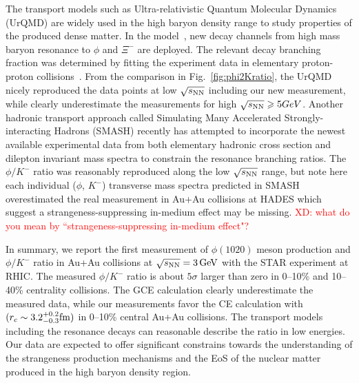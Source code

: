 \documentclass[%
 reprint,	
showpacs,
 amsmath,amssymb,
 aps,
 prc,
]{revtex4-1}
\begin{document}
The transport models such as Ultra-relativistic Quantum Molecular Dynamics (UrQMD) are widely used in the high baryon density range to study properties of the produced dense matter. In the model~\cite{Steinheimer_2015}, new decay channels from high mass baryon resonance to $\phi$ and $\Xi^-$ are deployed. The relevant decay branching fraction was determined by fitting the experiment data in elementary proton-proton collisions~\cite{PhysRevC.77.015204}. From the comparison in Fig.~\ref{fig:phi2Kratio}, the UrQMD nicely reproduced the data points at low ${\sqrt{s_{\rm NN}}}$ including our new measurement, while clearly underestimate the measurements for high $\sqrt{s_{\rm NN}}\geqslant 5 GeV$. Another hadronic transport approach called Simulating Many Accelerated Strongly-interacting Hadrons (SMASH) recently has attempted to incorporate the newest available experimental data from both elementary hadronic cross section and dilepton invariant mass spectra to constrain the resonance branching ratios. The $\phi/K^-$ ratio was reasonably reproduced along the low ${\sqrt{s_{\rm NN}}}$ range, but note here each individual ($\phi$, $K^-$) transverse mass spectra predicted in SMASH overestimated the real measurement in Au+Au collisions at HADES which suggest a strangeness-suppressing in-medium effect may be missing. \textcolor{red}{XD: what do you mean by ``strangeness-suppressing in-medium effect"?}

In summary, we report the first measurement of $\phi(1020)$ meson production and $\phi/K^-$ ratio in Au+Au collisions at ${\sqrt{s_{\rm NN}} = \rm{3\,GeV}}$ with the STAR experiment at RHIC. The measured $\phi/K^-$ ratio is about $5\sigma$ larger than zero in 0--10\% and 10--40\% centrality collisions. The GCE calculation clearly underestimate the measured data, while our measurements favor the CE calculation with $(r_c \sim 3.2_{-0.3}^{+0.2} \rm{fm})$ in 0--10\% central Au+Au collisions. The transport models including the resonance decays can reasonable describe the ratio in low energies. Our data are expected to offer significant constrains towards the understanding of the strangeness production mechanisms and the EoS of the nuclear matter produced in the high baryon density region.



\end{document}
